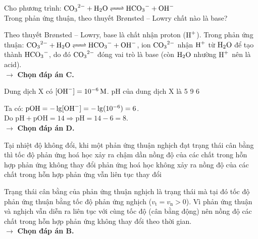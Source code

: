 \documentclass[11pt,a4paper]{article}
\begin{document}
\begin{ex}%
Cho phương trình: $\ce{CO3^{2-} + H2O <=> HCO3^- + OH^-}$\\
Trong phản ứng thuận, theo thuyết Brønsted -- Lowry chất nào là base?
\choice
{}
{}
{\True {}}
{}
\begin{loigiai}
Theo thuyết Brønsted -- Lowry, base là chất nhận proton ($\ce{H+}$). Trong phản ứng thuận:
$\ce{CO3^{2-} + H2O <=> HCO3^- + OH^-}$, ion $\ce{CO3^{2-}}$ nhận $\ce{H+}$ từ $\ce{H2O}$ để tạo thành $\ce{HCO3^-}$, do đó $\ce{CO3^{2-}}$ đóng vai trò là base (còn $\ce{H2O}$ nhường $\ce{H+}$ nên là acid).\\
$\rightarrow$ \textbf{Chọn đáp án C.}
\end{loigiai}
\end{ex}


\begin{ex}%
Dung dịch X có $[\ce{OH-}] = 10^{-6}\,\text{M}$. pH của dung dịch X là
\choice
{5}
{9}
{6}
{}
\begin{loigiai}
Ta có: $\mathrm{pOH} = -\lg[\ce{OH-}] = -\lg(10^{-6}) = 6$.\\
Do $\mathrm{pH} + \mathrm{pOH} = 14 \Rightarrow \mathrm{pH} = 14 - 6 = 8$.\\
$\rightarrow$ \textbf{Chọn đáp án D.}
\end{loigiai}
\end{ex}


\begin{ex}%
Tại nhiệt độ không đổi, khi một phản ứng thuận nghịch đạt trạng thái cân bằng thì
\choice
{tốc độ phản ứng hoá học xảy ra chậm dần}
{\True nồng độ của các chất trong hỗn hợp phản ứng không thay đổi}
{phản ứng hoá học không xảy ra}
{nồng độ của các chất trong hỗn hợp phản ứng vẫn liên tục thay đổi}
\begin{loigiai}
Trạng thái cân bằng của phản ứng thuận nghịch là trạng thái mà tại đó tốc độ phản ứng thuận bằng tốc độ phản ứng nghịch ($v_\text{t} = v_\text{n} > 0$). Vì phản ứng thuận và nghịch vẫn diễn ra liên tục với cùng tốc độ (cân bằng động) nên nồng độ các chất trong hỗn hợp phản ứng không thay đổi theo thời gian.\\
$\rightarrow$ \textbf{Chọn đáp án B.}
\end{loigiai}
\end{ex}
\end{document}
